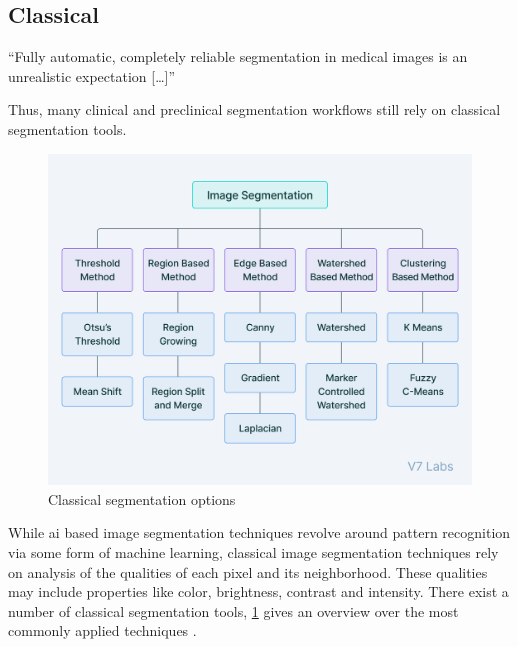 \subsection{Classical}\label{s:b-seg-techniques}
\begin{displayquote}
	``Fully automatic, completely reliable segmentation in medical images is an unrealistic expectation [\ldots]''
\end{displayquote}
Thus, many clinical and preclinical segmentation workflows still rely on classical segmentation tools.
\begin{figure}[h]
	\centerline{
		\includegraphics[scale=0.5]{images/classicalSegTree.png}}
	\caption{Classical segmentation options \cite{v7labsIntroductionImageSegmentation2021}}\label{fig:classicalSegTree}
\end{figure}
\noindent
While \acrshort{ai} based image segmentation techniques revolve around pattern recognition
via some form of machine learning,
classical image segmentation techniques rely on analysis of the qualities of each pixel and its neighborhood.
These qualities may include properties like color, brightness, contrast and intensity.
There exist a number of classical segmentation tools,
\cref{fig:classicalSegTree} gives an overview over the most commonly applied techniques
\cite{yuTechniquesChallengesImage2023,baliReviewStrategiesTechniques2015}.


